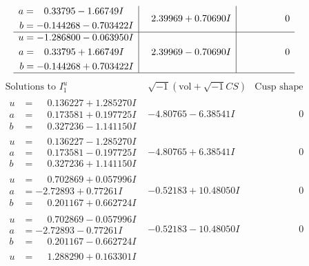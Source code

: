 \documentclass[1p]{elsarticle_modified}
\theoremstyle{definition}
\newcommand{\I}{\sqrt{-1}}
\begin{document}
$$\begin{array}{c|c|c}
\begin{aligned}
a &= \phantom{-}0.33795 - 1.66749 I \\
b &= -0.144268 - 0.703422 I\end{aligned}
 & \phantom{-}2.39969 + 0.70690 I & \phantom{-0.000000 } 0 \\ \hline\begin{aligned}
u &= -1.286800 - 0.063950 I \\
a &= \phantom{-}0.33795 + 1.66749 I \\
b &= -0.144268 + 0.703422 I\end{aligned}
 & \phantom{-}2.39969 - 0.70690 I & \phantom{-0.000000 } 0\\
 \hline 
 \end{array}$$\newpage$$\begin{array}{c|c|c}  
\text{Solutions to }I^u_{1}& \I (\text{vol} + \sqrt{-1}CS) & \text{Cusp shape}\\
 \hline 
\begin{aligned}
u &= \phantom{-}0.136227 + 1.285270 I \\
a &= \phantom{-}0.173581 + 0.197725 I \\
b &= \phantom{-}0.327236 - 1.141150 I\end{aligned}
 & -4.80765 - 6.38541 I & \phantom{-0.000000 } 0 \\ \hline\begin{aligned}
u &= \phantom{-}0.136227 - 1.285270 I \\
a &= \phantom{-}0.173581 - 0.197725 I \\
b &= \phantom{-}0.327236 + 1.141150 I\end{aligned}
 & -4.80765 + 6.38541 I & \phantom{-0.000000 } 0 \\ \hline\begin{aligned}
u &= \phantom{-}0.702869 + 0.057996 I \\
a &= -2.72893 + 0.77261 I \\
b &= \phantom{-}0.201167 + 0.662724 I\end{aligned}
 & -0.52183 + 10.48050 I & \phantom{-0.000000 } 0 \\ \hline\begin{aligned}
u &= \phantom{-}0.702869 - 0.057996 I \\
a &= -2.72893 - 0.77261 I \\
b &= \phantom{-}0.201167 - 0.662724 I\end{aligned}
 & -0.52183 - 10.48050 I & \phantom{-0.000000 } 0 \\ \hline\begin{aligned}
u &= \phantom{-}1.288290 + 0.163301 I \\

\end{aligned}
\end{array}$$
\end{document}
